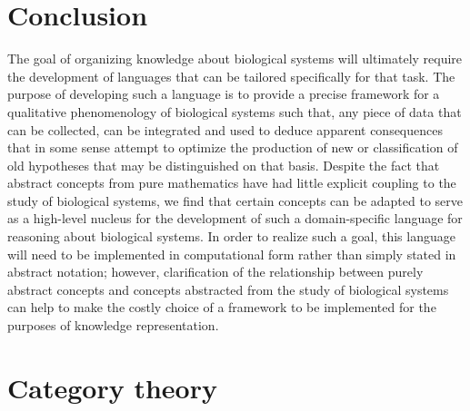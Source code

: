 \documentclass[aps,twocolumn]{revtex4-1}
\begin{document}
\section{Conclusion}

The goal of organizing knowledge about biological systems will ultimately require the development of languages that can be tailored specifically for that task. The purpose of developing such a language is to provide a precise framework for a qualitative phenomenology of biological systems such that, any piece of data that can be collected, can be integrated and used to deduce apparent consequences that in some sense attempt to optimize the production of new or classification of old hypotheses that may be distinguished on that basis. Despite the fact that abstract concepts from pure mathematics have had little explicit coupling to the study of biological systems, we find that certain concepts can be adapted to serve as a high-level nucleus for the development of such a domain-specific language for reasoning about biological systems. In order to realize such a goal, this language will need to be implemented in computational form rather than simply stated in abstract notation; however, clarification of the relationship between purely abstract concepts and concepts abstracted from the study of biological systems can help to make the costly choice of a framework to be implemented for the purposes of knowledge representation.

 



\appendix

\section{Category theory}\label{app:CatTh}


%
\end{document}
